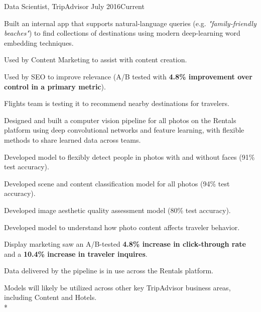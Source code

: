 \documentclass[print]{friggeri-cv} %
\begin{document}
\begin{description} \itemsep1pt \parskip0pt 
  \item {\largeheaderfont Data Scientist, TripAdvisor } \hfill
    {\smallheaderfont July 2016\textemdash Current}
    \begin{myitemize} \itemsep1pt \parskip1pt 
      \item Built an internal app that supports natural-language queries
      (e.g. \textit {"family-friendly beaches"}) to find collections of destinations
        using modern deep-learning word embedding techniques.
      \begin{myitemize} \itemsep1pt \parskip1pt 
        \item Used by Content Marketing to assist with content creation.
        \item Used by SEO to improve relevance (A/B
          tested with \textbf{4.8\% improvement over control in a primary
          metric}).
        \item Flights team is testing it to recommend nearby destinations for
          travelers.
      \end{myitemize}
      \item Designed and built a computer vision pipeline for all photos on the
        Rentals platform using deep convolutional networks and feature
        learning, with flexible methods to share learned data across teams.
        \begin{myitemize} \itemsep1pt \parskip0pt 
          \item Developed model to flexibly detect people in photos with and
            without faces (91\% test accuracy).
          \item Developed scene and content classification model for all photos
            (94\% test accuracy).
          \item Developed image aesthetic quality assessment model (80\%
            test accuracy).
          \item Developed model to understand how photo content affects
            traveler behavior.
          \item Display marketing saw an A/B-tested
            \textbf{4.8\% increase in click-through rate} and a \textbf{10.4\%
            increase in traveler inquires}.
          \item Data delivered by the pipeline is in use across the Rentals
            platform.
          \item Models will likely be utilized across other key TripAdvisor
            business areas, including Content and Hotels.\\*
        \end{myitemize}
    \end{myitemize}

  \end{description}
\end{document}
